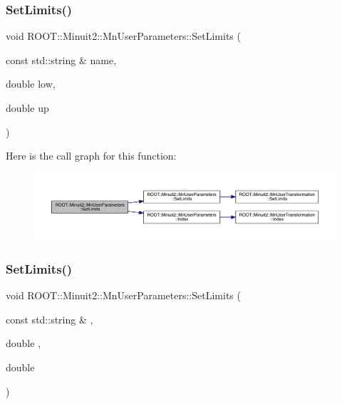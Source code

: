 \subsubsection{\texorpdfstring{SetLimits()}{SetLimits()}\hspace{0.1cm}{\footnotesize\ttfamily [4/6]}}
{\footnotesize\ttfamily void R\+O\+O\+T\+::\+Minuit2\+::\+Mn\+User\+Parameters\+::\+Set\+Limits (\begin{DoxyParamCaption}\item[{const std\+::string \&}]{name,  }\item[{double}]{low,  }\item[{double}]{up }\end{DoxyParamCaption})}

Here is the call graph for this function\+:
\nopagebreak
\begin{figure}[H]
\begin{center}
\leavevmode
\includegraphics[width=350pt]{d6/d10/classROOT_1_1Minuit2_1_1MnUserParameters_a3b22d430f97df8789a8890497c57eed4_cgraph}
\end{center}
\end{figure}
\mbox{\label{classROOT_1_1Minuit2_1_1MnUserParameters_a3b22d430f97df8789a8890497c57eed4}} 
\subsubsection{\texorpdfstring{SetLimits()}{SetLimits()}\hspace{0.1cm}{\footnotesize\ttfamily [5/6]}}
{\footnotesize\ttfamily void R\+O\+O\+T\+::\+Minuit2\+::\+Mn\+User\+Parameters\+::\+Set\+Limits (\begin{DoxyParamCaption}\item[{const std\+::string \&}]{,  }\item[{double}]{,  }\item[{double}]{ }\end{DoxyParamCaption})}

